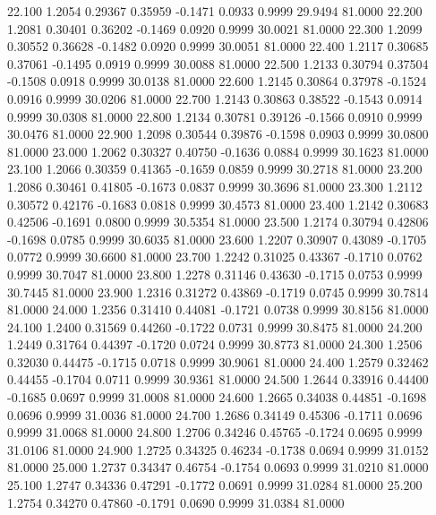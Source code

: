   22.100   1.2054   0.29367   0.35959  -0.1471   0.0933   0.9999  29.9494  81.0000
  22.200   1.2081   0.30401   0.36202  -0.1469   0.0920   0.9999  30.0021  81.0000
  22.300   1.2099   0.30552   0.36628  -0.1482   0.0920   0.9999  30.0051  81.0000
  22.400   1.2117   0.30685   0.37061  -0.1495   0.0919   0.9999  30.0088  81.0000
  22.500   1.2133   0.30794   0.37504  -0.1508   0.0918   0.9999  30.0138  81.0000
  22.600   1.2145   0.30864   0.37978  -0.1524   0.0916   0.9999  30.0206  81.0000
  22.700   1.2143   0.30863   0.38522  -0.1543   0.0914   0.9999  30.0308  81.0000
  22.800   1.2134   0.30781   0.39126  -0.1566   0.0910   0.9999  30.0476  81.0000
  22.900   1.2098   0.30544   0.39876  -0.1598   0.0903   0.9999  30.0800  81.0000
  23.000   1.2062   0.30327   0.40750  -0.1636   0.0884   0.9999  30.1623  81.0000
  23.100   1.2066   0.30359   0.41365  -0.1659   0.0859   0.9999  30.2718  81.0000
  23.200   1.2086   0.30461   0.41805  -0.1673   0.0837   0.9999  30.3696  81.0000
  23.300   1.2112   0.30572   0.42176  -0.1683   0.0818   0.9999  30.4573  81.0000
  23.400   1.2142   0.30683   0.42506  -0.1691   0.0800   0.9999  30.5354  81.0000
  23.500   1.2174   0.30794   0.42806  -0.1698   0.0785   0.9999  30.6035  81.0000
  23.600   1.2207   0.30907   0.43089  -0.1705   0.0772   0.9999  30.6600  81.0000
  23.700   1.2242   0.31025   0.43367  -0.1710   0.0762   0.9999  30.7047  81.0000
  23.800   1.2278   0.31146   0.43630  -0.1715   0.0753   0.9999  30.7445  81.0000
  23.900   1.2316   0.31272   0.43869  -0.1719   0.0745   0.9999  30.7814  81.0000
  24.000   1.2356   0.31410   0.44081  -0.1721   0.0738   0.9999  30.8156  81.0000
  24.100   1.2400   0.31569   0.44260  -0.1722   0.0731   0.9999  30.8475  81.0000
  24.200   1.2449   0.31764   0.44397  -0.1720   0.0724   0.9999  30.8773  81.0000
  24.300   1.2506   0.32030   0.44475  -0.1715   0.0718   0.9999  30.9061  81.0000
  24.400   1.2579   0.32462   0.44455  -0.1704   0.0711   0.9999  30.9361  81.0000
  24.500   1.2644   0.33916   0.44400  -0.1685   0.0697   0.9999  31.0008  81.0000
  24.600   1.2665   0.34038   0.44851  -0.1698   0.0696   0.9999  31.0036  81.0000
  24.700   1.2686   0.34149   0.45306  -0.1711   0.0696   0.9999  31.0068  81.0000
  24.800   1.2706   0.34246   0.45765  -0.1724   0.0695   0.9999  31.0106  81.0000
  24.900   1.2725   0.34325   0.46234  -0.1738   0.0694   0.9999  31.0152  81.0000
  25.000   1.2737   0.34347   0.46754  -0.1754   0.0693   0.9999  31.0210  81.0000
  25.100   1.2747   0.34336   0.47291  -0.1772   0.0691   0.9999  31.0284  81.0000
  25.200   1.2754   0.34270   0.47860  -0.1791   0.0690   0.9999  31.0384  81.0000
